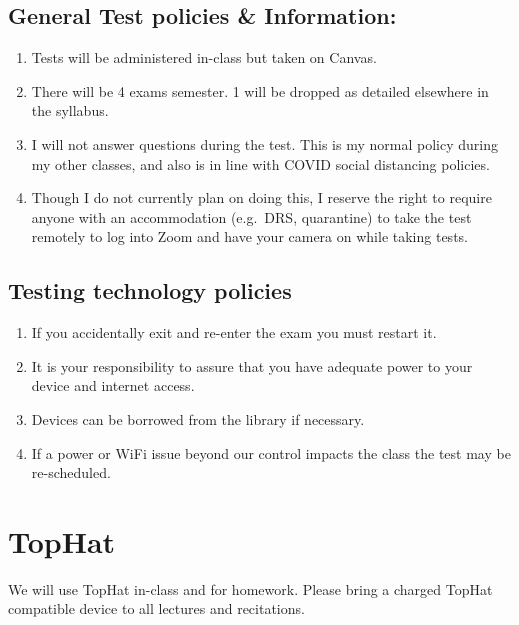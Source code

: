 \documentclass[
]{book}
\providecommand{\tightlist}{%
  \setlength{\itemsep}{0pt}\setlength{\parskip}{0pt}}
\begin{document}
\hypertarget{general-test-policies-information}{%
\section{General Test policies \& Information:}\label{general-test-policies-information}}

\begin{enumerate}
\def\labelenumi{\arabic{enumi}.}
\tightlist
\item
  Tests will be administered in-class but taken on Canvas.
\item
  There will be 4 exams semester. 1 will be dropped as detailed elsewhere in the syllabus.
\item
  I will not answer questions during the test. This is my normal policy during my other classes, and also is in line with COVID social distancing policies.
\item
  Though I do not currently plan on doing this, I reserve the right to require anyone with an accommodation (e.g.~DRS, quarantine) to take the test remotely to log into Zoom and have your camera on while taking tests.
\end{enumerate}

\hypertarget{testing-technology-policies}{%
\section{Testing technology policies}\label{testing-technology-policies}}

\begin{enumerate}
\def\labelenumi{\arabic{enumi}.}
\tightlist
\item
  If you accidentally exit and re-enter the exam you must restart it.
\item
  It is your responsibility to assure that you have adequate power to your device and internet access.
\item
  Devices can be borrowed from the library if necessary.
\item
  If a power or WiFi issue beyond our control impacts the class the test may be re-scheduled.
\end{enumerate}

\hypertarget{tophat}{%
\chapter{TopHat}\label{tophat}}

We will use TopHat in-class and for homework. Please bring a charged TopHat compatible device to all lectures and recitations.
\end{document}
